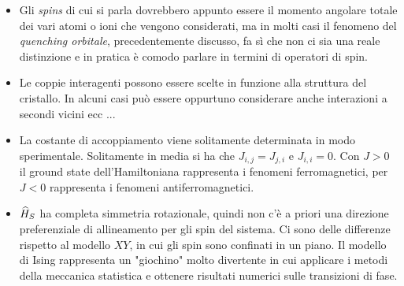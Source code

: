 \begin{itemize}
	\item Gli \textit{spins} di cui si parla dovrebbero appunto essere il momento angolare totale dei vari atomi o ioni che vengono considerati, ma in molti casi il fenomeno del \textit{quenching orbitale}, precedentemente discusso, fa s\`i che non ci sia una reale distinzione e in pratica \`e comodo parlare in termini di operatori di spin.
	\item Le coppie interagenti possono essere scelte in funzione alla struttura del cristallo. In alcuni casi pu\`o essere oppurtuno considerare anche interazioni a secondi vicini ecc ...
	\item La costante di accoppiamento viene solitamente determinata in modo sperimentale. Solitamente in media si ha che $J_{i,j} = J_{j,i}$ e $J_{i,i} = 0$. Con $J>0$ il ground state dell'Hamiltoniana rappresenta i fenomeni ferromagnetici, per $J<0$ rappresenta i fenomeni antiferromagnetici.
	\item $\op{H} _S$ ha completa simmetria rotazionale, quindi non c'\`e a priori una direzione preferenziale di allineamento per gli spin del sistema. Ci sono delle differenze rispetto al modello $XY$, in cui gli spin sono confinati in un piano. Il modello di Ising rappresenta un "giochino" molto divertente in cui applicare i metodi della meccanica statistica e ottenere risultati numerici sulle transizioni di fase.
\end{itemize}
 


